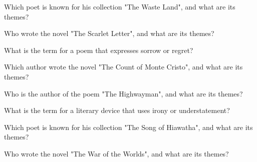 \documentclass[12pt,a4paper]{book}
\begin{document}
\begin{enhancedmcq}[Question 42]{Which poet is known for his collection "The Waste Land", and what are its themes?}
\end{enhancedmcq}

\begin{enhancedmcq}[Question 43]{Who wrote the novel "The Scarlet Letter", and what are its themes?}
\end{enhancedmcq}

\begin{enhancedmcq}[Question 44]{What is the term for a poem that expresses sorrow or regret?}
\end{enhancedmcq}

\begin{enhancedmcq}[Question 45]{Which author wrote the novel "The Count of Monte Cristo", and what are its themes?}
\end{enhancedmcq}

\begin{enhancedmcq}[Question 46]{Who is the author of the poem "The Highwayman", and what are its themes?}
\end{enhancedmcq}

\begin{enhancedmcq}[Question 47]{What is the term for a literary device that uses irony or understatement?}
\end{enhancedmcq}

\begin{enhancedmcq}[Question 48]{Which poet is known for his collection "The Song of Hiawatha", and what are its themes?}
\end{enhancedmcq}

\begin{enhancedmcq}[Question 49]{Who wrote the novel "The War of the Worlds", and what are its themes?}
\end{enhancedmcq}
\end{document}
